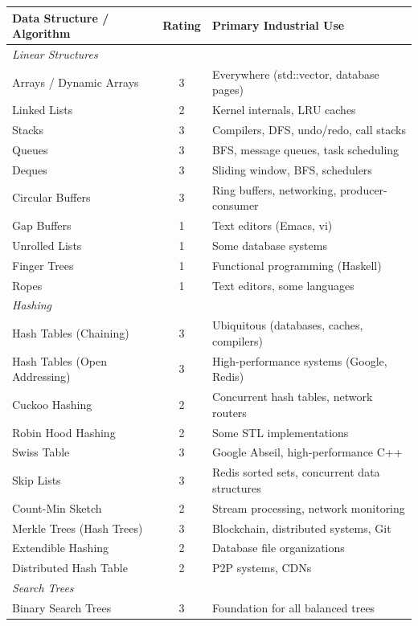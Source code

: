 \begin{center}
\small
\begin{tabular}{lcl}
\toprule
\textbf{Data Structure / Algorithm} & \textbf{Rating} & \textbf{Primary Industrial Use} \\
\midrule
\multicolumn{3}{l}{\textit{Linear Structures}} \\
\midrule
Arrays / Dynamic Arrays & 3 & Everywhere (std::vector, database pages) \\
Linked Lists & 2 & Kernel internals, LRU caches \\
Stacks & 3 & Compilers, DFS, undo/redo, call stacks \\
Queues & 3 & BFS, message queues, task scheduling \\
Deques & 3 & Sliding window, BFS, schedulers \\
Circular Buffers & 3 & Ring buffers, networking, producer-consumer \\
Gap Buffers & 1 & Text editors (Emacs, vi) \\
Unrolled Lists & 1 & Some database systems \\
Finger Trees & 1 & Functional programming (Haskell) \\
Ropes & 1 & Text editors, some languages \\
\midrule
\multicolumn{3}{l}{\textit{Hashing}} \\
\midrule
Hash Tables (Chaining) & 3 & Ubiquitous (databases, caches, compilers) \\
Hash Tables (Open Addressing) & 3 & High-performance systems (Google, Redis) \\
Cuckoo Hashing & 2 & Concurrent hash tables, network routers \\
Robin Hood Hashing & 2 & Some STL implementations \\
Swiss Table & 3 & Google Abseil, high-performance C++ \\
Skip Lists & 3 & Redis sorted sets, concurrent data structures \\
Count-Min Sketch & 2 & Stream processing, network monitoring \\
Merkle Trees (Hash Trees) & 3 & Blockchain, distributed systems, Git \\
Extendible Hashing & 2 & Database file organizations \\
Distributed Hash Table & 2 & P2P systems, CDNs \\
\midrule
\multicolumn{3}{l}{\textit{Search Trees}} \\
\midrule
Binary Search Trees & 3 & Foundation for all balanced trees \\

\end{tabular}
\end{center}
